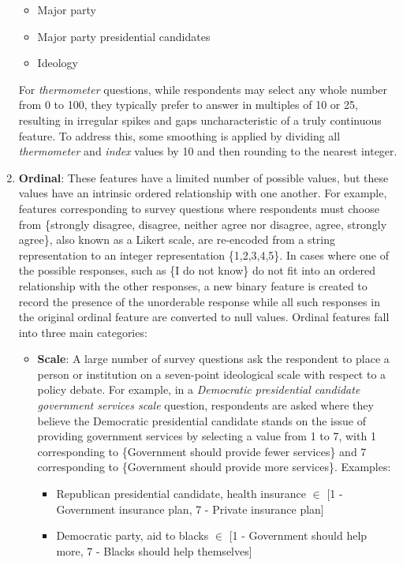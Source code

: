 \documentclass{article}
\begin{document}
\begin{enumerate}
{\begin{itemize}
{					\begin{itemize}
						\item{Major party}
						\item{Major party presidential candidates}
						\item{Ideology}
					\end{itemize}
				} 
			\end{itemize}
		 For \textit{thermometer} questions, while respondents may select any whole number from 0 to 100, they typically prefer to answer in multiples of 10 or 25, resulting in irregular spikes and gaps uncharacteristic of a truly continuous feature. To address this, some smoothing is applied by dividing all \textit{thermometer} and \textit{index} values by 10 and then rounding to the nearest integer.}
		\item{\textbf{Ordinal}: These features have a limited number of possible values, but these values have an intrinsic ordered relationship with one another. For example, features corresponding to survey questions where respondents must choose from \{strongly disagree, disagree, neither agree nor disagree, agree, strongly agree\}, also known as a Likert scale, are re-encoded from a string representation to an integer representation \{1,2,3,4,5\}. In cases where one of the possible responses, such as \{I do not know\} do not fit into an ordered relationship with the other responses, a new binary feature is created to record the presence of the unorderable response while all such responses in the original ordinal feature are converted to null values. Ordinal features fall into three main categories:
			\begin{itemize}
				\item{\textbf{Scale}: A large number of survey questions ask the respondent to place a person or institution on a seven-point ideological scale with respect to a policy debate. For example, in a \textit{Democratic presidential candidate government services scale} question, respondents are asked where they believe the Democratic presidential candidate stands on the issue of providing government services by selecting a value from 1 to 7, with 1 corresponding to \{Government should provide fewer services\} and 7 corresponding to \{Government should provide more services\}. Examples:
				\begin{itemize}
					\item{Republican presidential candidate, health insurance $\in$ [1 - Government insurance plan, 7 - Private insurance plan]}
					\item{Democratic party, aid to blacks $\in$ [1 - Government should help more, 7 - Blacks should help themselves]}

\end{itemize}}
\end{itemize}}
\end{enumerate}
\end{document}
